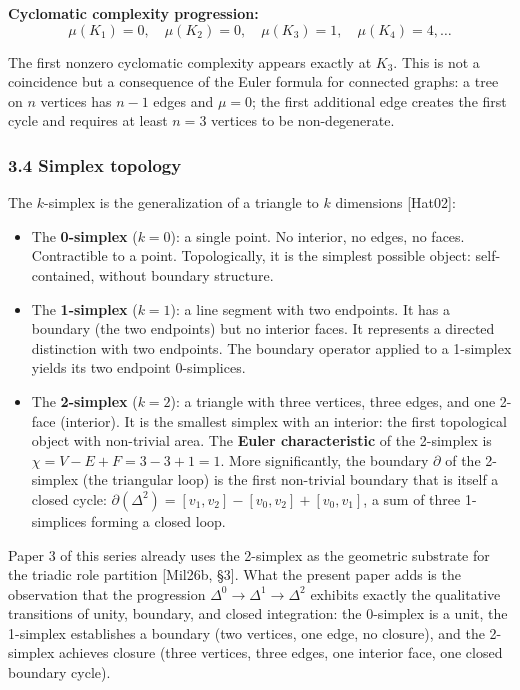 \documentclass[
  11pt,
  letterpaper,
]{article}
\begin{document}
\textbf{Cyclomatic complexity progression:}
\[\mu(K_1) = 0, \quad \mu(K_2) = 0, \quad \mu(K_3) = 1, \quad \mu(K_4) = 4, \ldots\]

The first nonzero cyclomatic complexity appears exactly at \(K_3\). This
is not a coincidence but a consequence of the Euler formula for
connected graphs: a tree on \(n\) vertices has \(n-1\) edges and
\(\mu = 0\); the first additional edge creates the first cycle and
requires at least \(n = 3\) vertices to be non-degenerate.

\subsubsection{3.4 Simplex topology}\label{simplex-topology}

The \(k\)-simplex is the generalization of a triangle to \(k\)
dimensions {[}Hat02{]}:

\begin{itemize}
\item
  The \textbf{0-simplex} (\(k=0\)): a single point. No interior, no
  edges, no faces. Contractible to a point. Topologically, it is the
  simplest possible object: self-contained, without boundary structure.
\item
  The \textbf{1-simplex} (\(k=1\)): a line segment with two endpoints.
  It has a boundary (the two endpoints) but no interior faces. It
  represents a directed distinction with two endpoints. The boundary
  operator applied to a 1-simplex yields its two endpoint 0-simplices.
\item
  The \textbf{2-simplex} (\(k=2\)): a triangle with three vertices,
  three edges, and one 2-face (interior). It is the smallest simplex
  with an interior: the first topological object with non-trivial area.
  The \textbf{Euler characteristic} of the 2-simplex is
  \(\chi = V - E + F = 3 - 3 + 1 = 1\). More significantly, the boundary
  \(\partial\) of the 2-simplex (the triangular loop) is the first
  non-trivial boundary that is itself a closed cycle:
  \(\partial(\Delta^2) = [v_1, v_2] - [v_0, v_2] + [v_0, v_1]\), a sum
  of three 1-simplices forming a closed loop.
\end{itemize}

Paper 3 of this series already uses the 2-simplex as the geometric
substrate for the triadic role partition {[}Mil26b, §3{]}. What the
present paper adds is the observation that the progression
\(\Delta^0 \to \Delta^1 \to \Delta^2\) exhibits exactly the qualitative
transitions of unity, boundary, and closed integration: the 0-simplex is
a unit, the 1-simplex establishes a boundary (two vertices, one edge, no
closure), and the 2-simplex achieves closure (three vertices, three
edges, one interior face, one closed boundary cycle).
\end{document}
